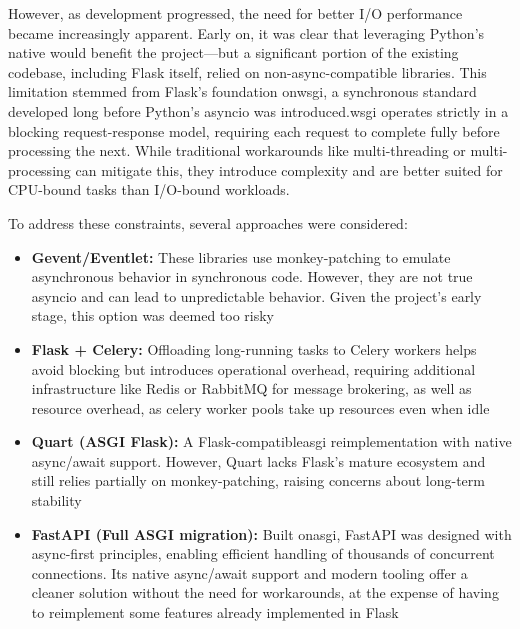         However, as development progressed, the need for better I/O performance became increasingly apparent. Early on, it was 
        clear that leveraging Python's native  would benefit the project—but a significant portion of the existing codebase, 
        including Flask itself, relied on non-async-compatible libraries. This limitation stemmed from Flask's foundation on\ac{wsgi}, a 
        synchronous standard developed long before Python's asyncio was introduced.\ac{wsgi} operates strictly in a blocking request-response 
        model, requiring each request to complete fully before processing the next. While traditional workarounds like multi-threading 
        or multi-processing can mitigate this, they introduce complexity and are better suited for CPU-bound tasks than I/O-bound workloads.

        To address these constraints, several approaches were considered:

        \begin{itemize}
            \item \textbf{Gevent/Eventlet:} These libraries use monkey-patching to emulate asynchronous behavior in synchronous code. However, 
            they are not true asyncio and can lead to unpredictable behavior. Given the project's early stage, this option was deemed too risky

            \item \textbf{Flask + Celery:} Offloading long-running tasks to Celery workers helps avoid blocking but introduces operational overhead, 
            requiring additional infrastructure like Redis or RabbitMQ for message brokering, as well as resource overhead, as celery worker pools take 
            up resources even when idle

            \item \textbf{Quart (ASGI Flask):} A Flask-compatible\ac{asgi} reimplementation with native async/await support. However, Quart lacks 
            Flask's mature ecosystem and still relies partially on monkey-patching, raising concerns about long-term stability

            \item \textbf{FastAPI (Full ASGI migration):} Built on\ac{asgi}, FastAPI was designed with async-first principles, enabling efficient handling 
            of thousands of concurrent connections. Its native async/await support and modern tooling offer a cleaner solution without the need 
            for workarounds, at the expense of having to reimplement some features already implemented in Flask
        \end{itemize}

